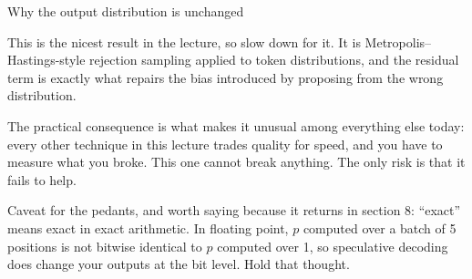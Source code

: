 \documentclass[aspectratio=169,10pt]{beamer}
\begin{document}
\begin{frame}[shrink=4]{Why the output distribution is unchanged}
{  This is the nicest result in the lecture, so slow down for it.
  It is Metropolis--Hastings-style rejection sampling applied
  to token distributions, and the residual term is exactly what repairs the
  bias introduced by proposing from the wrong distribution.

  The practical consequence is what makes it unusual among everything else
  today: every other technique in this lecture trades quality for speed, and
  you have to measure what you broke. This one cannot break anything. The only
  risk is that it fails to help.

  Caveat for the pedants, and worth saying because it returns in section 8:
  ``exact'' means exact in exact arithmetic. In floating point, $p$ computed over
  a batch of 5 positions is not bitwise identical to $p$ computed over 1, so
  speculative decoding does change your outputs at the bit level. Hold that
  thought.}
\end{frame}
\end{document}
